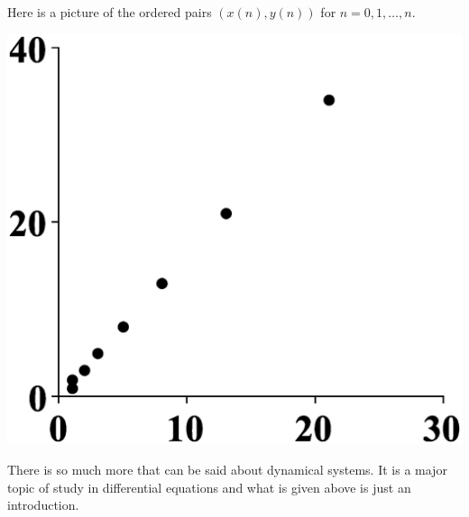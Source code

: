 Here is a picture of the ordered pairs $(x(n),y(n)) $ for
$n=0,1,\ldots,n$.
\begin{center}
  \includegraphics[bb=0 0 800 800,scale=.2]{figures/fibonacci.eps}
\end{center}
There is so much more that can be said about dynamical systems. It is
a major topic of study in differential equations and what is given
above is just an introduction.
